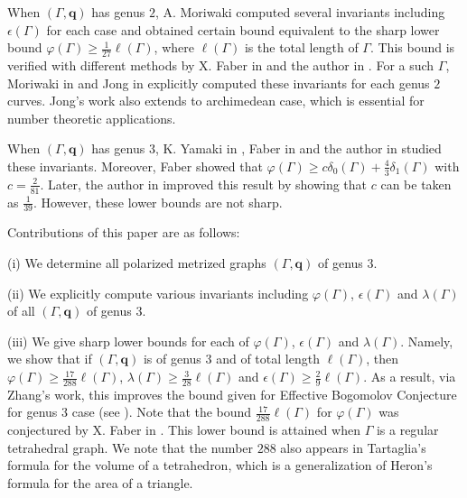 \documentclass[12pt]{amsart}
\theoremstyle{example}
\theoremstyle{definition}
\theoremstyle{notation}
\begin{document}
When $({\Gamma}, {\textbf{q}})$ has genus $2$, A. Moriwaki computed several invariants including ${\epsilon({\Gamma})}$ for each case and obtained certain bound equivalent to the sharp lower bound ${\varphi ({\Gamma})} \geq \frac{1}{27} {\ell ({\Gamma})}$, where ${\ell ({\Gamma})}$ is the total length of ${\Gamma}$. This bound is verified with different methods by X. Faber in \cite{Fa} and the author in \cite{C5}. For a such ${\Gamma}$, Moriwaki in \cite{AM3} and Jong in \cite{J} explicitly computed these invariants for each genus $2$ curves. Jong's work also extends to archimedean case, which is essential for number theoretic applications.

When $({\Gamma}, {\textbf{q}})$ has genus $3$, K. Yamaki in \cite{KY3}, Faber in \cite{Fa} and the author in \cite{C5} studied these invariants. Moreover, Faber showed \cite[Theorem 3.4]{Fa} that  ${\varphi ({\Gamma})} \geq c \delta_0 (\Gamma)+ \frac{4}{3} \delta_1 (\Gamma) $ with $c=\frac{2}{81}$. Later, the author in \cite[Theorem 2.11]{C5} improved this result by showing that $c$ can be taken as $ \frac{1}{39}$. However, these lower bounds are not sharp.

Contributions of this paper are as follows:

(i) We determine all polarized metrized graphs $({\Gamma},{\textbf{q}})$ of genus $3$.

(ii) We explicitly compute various invariants including ${\varphi ({\Gamma})}$, ${\epsilon({\Gamma})}$ and ${\lambda ({\Gamma})}$ of all $({\Gamma},{\textbf{q}})$ of genus $3$.

(iii) We give sharp lower bounds for each of ${\varphi ({\Gamma})}$, ${\epsilon({\Gamma})}$ and ${\lambda ({\Gamma})}$. Namely, we show that if $({\Gamma},{\textbf{q}})$ is of genus $3$ and of total length ${\ell ({\Gamma})}$, then
${\varphi ({\Gamma})} \geq \frac{17}{288}{\ell ({\Gamma})}$, ${\lambda ({\Gamma})} \geq \frac{3}{28} {\ell ({\Gamma})}$ and ${\epsilon({\Gamma})} \geq \frac{2}{9} {\ell ({\Gamma})}$. As a result, via Zhang's work, this improves the bound given for Effective Bogomolov Conjecture for genus $3$ case (see \cite[Theorems 2.3 and 2.4]{C5}). Note that the bound $\frac{17}{288}{\ell ({\Gamma})}$ for ${\varphi ({\Gamma})}$ was conjectured by X. Faber in \cite[Remark 5.1]{Fa}. This lower bound is attained when ${\Gamma}$ is a regular tetrahedral graph. We note that the number $288$ also appears in Tartaglia's formula for the volume of a tetrahedron,
which is a generalization of Heron's formula for the area of a triangle.
\end{document}
